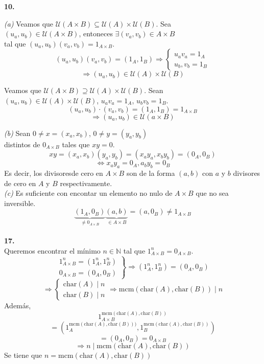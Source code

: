 \documentclass{article}
\begin{document}
\begin{multicols}{2}
\noindent
\textbf{10.}

\indent \textit{(a)} Veamos que $\mathcal{U}(A\times B) \subseteq \mathcal{U}(A)\times\mathcal{U}(B)$. Sea\\
\indent $(u_a,u_b)\in \mathcal{U}(A\times B)$, entoneces $\exists (v_a,v_b)\in A\times B$\\
\indent tal que $(u_a,u_b)(v_a,v_b)=1_{A\times B}$.
$$
(u_a,u_b)(v_a,v_b)=(1_A,1_B) \Rightarrow
\left\{\begin{array}{l}
    u_av_a=1_A\\
    u_b,v_b=1_B
\end{array}\right.
$$
$$
\Rightarrow (u_a,u_b)\in \mathcal{U}(A)\times\mathcal{U}(B)
$$

\indent Veamos que $\mathcal{U}(A\times B) \supseteq \mathcal{U}(A)\times\mathcal{U}(B)$. Sean\\
\indent $(u_a,u_b)\in\mathcal{U}(A)\times\mathcal{U}(B)$, $u_av_a=1_A$, $u_bv_b=1_B$.
$$
(u_a,u_b)\cdot(v_a,v_b)= (1_A, 1_B) = 1_{A\times B}
$$
$$
\Rightarrow (u_a,u_b)\in\mathcal{U}(a\times B)
$$

\indent \textit{(b)} Sean $0\ne x=(x_a,x_b)$, $0\ne y=(y_a,y_b)$\\
\indent distintos de $0_{A\times B}$ tales que $xy=0$.
$$
xy=(x_a,x_b)(y_a,y_b)=(x_ay_a,x_by_b)=(0_A,0_B)
$$
$$
\Leftrightarrow x_ay_a=0_A, a_by_b=0_B
$$
\indent Es decir, los divisoresde cero en $A\times B$ son de la \indent forma $(a,b)$ con $a$ y $b$ divisores de cero en $A$ y $B$ \indent respectivamente.\\

\indent \textit{(c)} Es suficiente con encontar un elemento no \indent nulo de $A\times B$ que no sea inversible.
$$
\underbrace{(1_A,0_B)}_{\ne 0_{A\times B}}\underbrace{(a,b)}_{\in A\times B} = (a,0_B) \ne 1_{A\times B}
$$\\

\noindent
\textbf{17.}\\
\indent Queremos encontrar el mínimo $n\in\mathbb{N}$ tal que \indent $1_{A\times B}^n = 0_{A\times B}$.
$$
\left.\begin{array}{l}
    1_{A\times B}^n = (1_A^n, 1_B^n)\\
    0_{A\times B} = (0_A, 0_B)
\end{array}\right\} \Rightarrow (1_A^n, 1_B^n) = (0_A, 0_B)
$$
$$
\Rightarrow
\left\{\begin{array}{l}
    \text{char} (A)\mid n\\
    \text{char} (B)\mid n
\end{array}\right. \Rightarrow
\text{mcm}(\text{char} (A), \text{char} (B))\mid n
$$
\indent Además,
$$
1_{A\times B}^{\text{mcm}(\text{char} (A), \text{char} (B))}
$$
$$
= (1_A^{\text{mcm}(\text{char} (A), \text{char} (B)))}, 1_B^{\text{mcm}(\text{char} (A), \text{char} (B))})
$$
$$
= (0_A, 0_B) = 0_{A\times B}
$$
$$
\Rightarrow n \mid \text{mcm}(\text{char} (A), \text{char} (B))
$$
\indent Se tiene que $n = \text{mcm}(\text{char} (A), \text{char} (B))$
\end{multicols}
\end{document}
